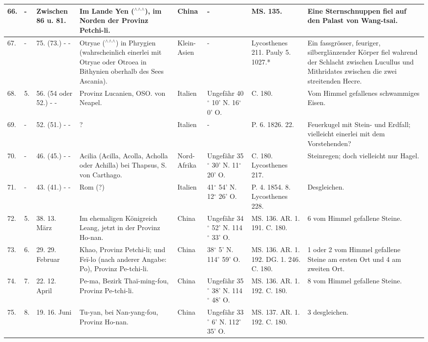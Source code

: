 \documentclass[a4paper, 11pt, oneside, polutonikogreek, german]{article}
\begin{document}
\begin{table}[!ht]
\begin{tabular}{|l|l|l|l|l|l|l|l|}
        66. & - & Zwischen 86 u. 81. & Im Lande Yen ($^\wedge$$^\wedge$$^\wedge$), im Norden der Provinz Petchi-li. & China & - & MS. 135. & Eine Sternschnuppen fiel auf den Palast von Wang-tsai. \\ \hline
        67. & - & 75. (73.) - - & Otryae ($^\wedge$$^\wedge$$^\wedge$) in Phrygien (wahrscheinlich einerlei mit Otryae oder Otroea in Bithynien oberhalb des Sees Ascania). & Klein-Asien & - & Lycosthenes 211. Pauly 5. 1027.* & Ein fassgrösser, feuriger, silberglänzender Körper fiel wahrend der Schlacht zwischen Lucullus und Mithridates zwischen die zwei streitenden Hecre. \\ \hline
        68. & 5. & 56. (54 oder 52.) - - & Provinz Lucanien, OSO. von Neapel. & Italien & Ungefähr 40$^\circ$ 10' N. 16$^\circ$ 0' O. & C. 180. & Vom Himmel gefallenes schwammiges Eisen. \\ \hline
        69. & - & 52. (51.) - - & ? & Italien & - & P. 6. 1826. 22. & Feuerkugel mit Stein- und Erdfall; vielleicht einerlei mit dem Vorstehenden? \\ \hline
        70. & - & 46. (45.) - - & Acilia (Acilla, Acolla, Acholla oder Achilla) bei Thapsus, S. von Carthago. & Nord-Afrika & Ungefähr 35$^\circ$ 30' N. 11$^\circ$ 20' O. & C. 180. Lycosthenes 217. & Steinregen; doch vielleicht nur Hagel. \\ \hline
        71. & - & 43. (41.) - - & Rom (?) & Italien & 41$^\circ$ 54' N. 12$^\circ$ 26' O. & P. 4. 1854. 8. Lycosthenes 228. & Desgleichen. \\ \hline
        72. & 5. & 38. 13. März & Im ehemaligen Königreich Leang, jetzt in der Provinz Ho-nan. & China & Ungefähr 34$^\circ$ 52' N. 114$^\circ$ 33' O. & MS. 136. AR. 1. 191. C. 180. & 6 vom Himmel gefallene Steine. \\ \hline
        73. & 6. & 29. 29. Februar & Khao, Provinz Petchi-li; und Feï-lo (nach anderer Angabe: Po), Provinz Pe-tchi-li. & China & 38$^\circ$ 5' N. 114$^\circ$ 59' O. & MS. 136. AR. 1. 192. DG. 1. 246. C. 180. & 1 oder 2 vom Himmel gefallene Steine am ersten Ort und 4 am zweiten Ort. \\ \hline
        74. & 7. & 22. 12. April & Pe-ma, Bezirk Thaï-ming-fou, Provinz Pe-tchi-li. & China & Ungefähr 35$^\circ$ 38' N. 114$^\circ$ 48' O. & MS. 136. AR. 1. 192. C. 180. & 8 vom Himmel gefallene Steine. \\ \hline
        75. & 8. & 19. 16. Juni & Tu-yan, bei Nan-yang-fou, Provinz Ho-nan. & China & Ungefähr 33$^\circ$ 6' N. 112$^\circ$ 35' O. & MS. 137. AR. 1. 192. C. 180. & 3 desgleichen. \\ \hline

\end{tabular}
\end{table}
\end{document}
